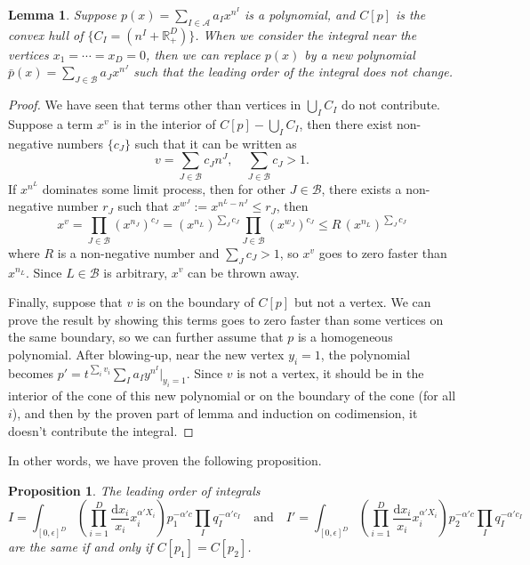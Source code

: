 \documentclass[12pt]{article}
\theoremstyle{definition}
\theoremstyle{plain}
\newtheorem{lem}[para]{Lemma}
\newtheorem{pro}[para]{Proposition}
\newcommand{\dif}{\mathrm{d}} %
\begin{document}
\begin{lem}
Suppose $p(x)=\sum_{I\in \mathscr A}a_I x^{n^I}$ is a polynomial, and $C[p]$ is the convex hull
of $\{C_{I}=(n^I+\mathbb R^D_{+})\}$. When we consider the integral near the vertices $x_1=\cdots=x_D=0$, 
then we can replace $p(x)$ by a new polynomial $\bar p(x)=\sum_{J\in \mathscr B}a_J x^{n^J}$ such that
the leading order of the integral does not change.
\end{lem}


\begin{proof}
We have seen that terms other than vertices in $\bigcup_I C_I$ do not contribute. Suppose a term $x^v$ 
is in the interior of $C[p]-\bigcup_I C_I$,  
then there exist non-negative numbers $\{c_J\}$ such that it can be written as 
\[
	v = \sum_{J\in \mathscr B}c_J n^J,\quad \sum_{J\in \mathscr B} c_J>1.
\]
If $x^{n^L}$ dominates some limit process, 
then for other $J\in \mathscr B$, there exists a non-negative number $r_J$ such that
$x^{w^J}:=x^{n^L-n^J}\leq r_J$, then 
\[
	x^v = \prod_{J\in\mathscr B} (x^{n_J})^{c_J} = 
	(x^{n_L})^{\sum_J c_J}\prod_{J\in \mathscr B} 
	(x^{w_J})^{c_J}\leq R\,(x^{n_L})^{\sum_J c_J}
\] 
where $R$ is a non-negative number and $\sum_J c_J>1$, so $x^v$ goes to 
zero faster than $x^{n_L}$. Since $L\in \mathscr B$ is arbitrary, $x^v$ can be thrown away.

Finally, suppose that $v$ is on the boundary of $C[p]$ but not a vertex.
We can prove the result by showing this terms goes to zero faster than some vertices on the 
same boundary, so we can further assume that $p$ is a homogeneous polynomial.
After blowing-up, near the new vertex
$y_i=1$, the polynomial becomes $p'=t^{\sum_i v_i}\sum_{I}a_I y^{n^I}|_{y_i=1}$. 
Since $v$ is not a vertex, it should be in the interior of the cone of this new polynomial or 
on the boundary of the cone (for all $i$), and then by 
the proven part of lemma and induction on codimension, it doesn't contribute the integral.
\end{proof}

In other words, we have proven the following proposition. 

\begin{pro}
The leading order of integrals
\[
	I=\int_{[0,\epsilon]^D} \left(\prod_{i=1}^D\frac{\dif x_i}{x_i}x_i^{\alpha' X_i}\right)
	p_1^{-\alpha' c} \prod_I q_I^{-\alpha' c_I}
	\quad \text{and} \quad 
	I'=\int_{[0,\epsilon]^D} \left(\prod_{i=1}^D\frac{\dif x_i}{x_i}x_i^{\alpha' X_i}\right)
	p_2^{-\alpha' c} \prod_I q_I^{-\alpha' c_I}
\]
are the same if and only if $C[p_1]=C[p_2]$.
\end{pro}
\end{document}
